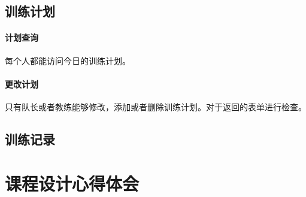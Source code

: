 \subsection{训练计划}
\paragraph{计划查询}
每个人都能访问今日的训练计划。

\paragraph{更改计划}
只有队长或者教练能够修改，添加或者删除训练计划。对于返回的表单进行检查。

\subsection{训练记录}

\section{课程设计心得体会}






